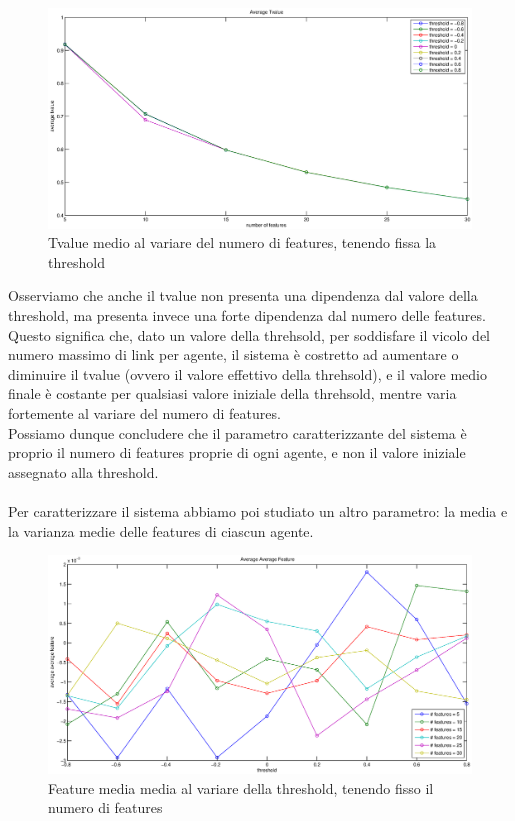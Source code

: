 \documentclass[a4paper,10pt]{article}
\begin{document}
\begin{figure}[!ht]
\begin{center}
\includegraphics[width=\textwidth]{AverageTvalueFeatures.eps}
\end{center}
\caption{Tvalue medio al variare del numero di features, tenendo fissa la threshold}
\label{2.1.4}
\end{figure}

Osserviamo che anche il tvalue non presenta una dipendenza dal valore della threshold, ma presenta invece una forte dipendenza dal numero delle features.
Questo significa che, dato un valore della threhsold, per soddisfare il vicolo del numero massimo di link per agente, il sistema \`{e} costretto ad aumentare o diminuire il tvalue (ovvero il valore effettivo della threhsold), e il valore medio finale \`{e} costante per qualsiasi valore iniziale della threhsold, mentre varia fortemente al variare del numero di features.
\\Possiamo dunque concludere che il parametro caratterizzante del sistema \`{e} proprio il numero di features proprie di ogni agente, e non il valore iniziale assegnato alla threshold.
\\\\Per caratterizzare il sistema abbiamo poi studiato un altro parametro: la media e la varianza medie delle features di ciascun agente.

\begin{figure}[!ht]
\begin{center}
\includegraphics[width=\textwidth]{AverageAverageFeatureThreshold.eps}
\end{center}
\caption{Feature media media al variare della threshold, tenendo fisso il numero di features}
\label{2.1.5}
\end{figure}
\end{document}

